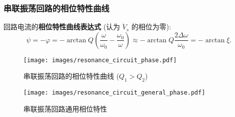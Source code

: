\subsubsection{串联振荡回路的相位特性曲线} \label{串联振荡回路的相位特性曲线}

回路电流的\textbf{相位特性曲线表达式} (认为 $\dot{V}_s$ 的相位为零):
\begin{equation} \label{eq:2.1 psi}
    \psi=-\varphi=-\arctan Q\left(\frac{\omega}{\omega_0}-\frac{\omega_0}{\omega}\right)\approx-\arctan Q\frac{2\Delta\omega}{\omega_0}=-\arctan\xi.
\end{equation}

\begin{figure}[H]
    \centering
    \begin{minipage}{.356\textwidth}
        \centering
        \texttt{[image: images/resonance\_circuit\_phase.pdf]}
        \caption{串联振荡回路的相位特性曲线 ($Q_1>Q_2$)}
    \end{minipage}\qquad
    \begin{minipage}{.394\textwidth}
        \centering
        \texttt{[image: images/resonance\_circuit\_general\_phase.pdf]}
        \caption{串联振荡回路通用相位特性}
    \end{minipage}
\end{figure}

